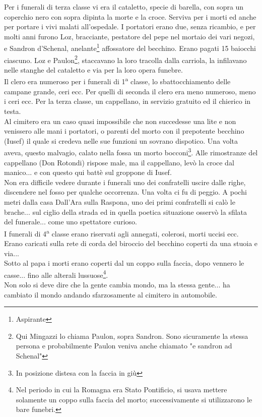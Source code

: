 \indent Per i funerali di terza classe vi era il cataletto, specie di barella, con sopra un coperchio nero con sopra dipinta la morte e la croce. Serviva per i morti ed anche per portare i vivi malati all'ospedale. I portatori erano due, senza ricambio, e per molti anni furono Loz, bracciante, pestatore del pepe nel mortaio dei vari negozi, e Sandron d'Schenal, anelante\footnote{Aspirante} affossatore del becchino. Erano pagati 15 baiocchi ciascuno. Loz e Paulon\footnote{Qui Mingazzi lo chiama Paulon, sopra Sandron. Sono sicuramente la stessa persona e probabilmente Paulon veniva anche chiamato "e sandron ad Schenal"}, staccavano la loro tracolla dalla carriola, la infilavano nelle stanghe del cataletto e via per la loro opera funebre.\\
\indent Il clero era numeroso per i funerali di 1\textsuperscript{a} classe, lo sbattocchiamento delle campane grande, ceri ecc. Per quelli di seconda il clero era meno numeroso, meno i ceri ecc. Per la terza classe, un cappellano, in servizio gratuito ed il chierico in testa.\\
\indent Al cimitero era un caso quasi impossibile che non succedesse una lite e non venissero alle mani i portatori, o parenti del morto con il prepotente becchino (Iusef) il quale si credeva nelle sue funzioni un sovrano dispotico. Una volta aveva, questo malvagio, calato nella fossa un morto bocconi\footnote{In posizione distesa con la faccia in giù}. Alle rimostranze del cappellano (Don Rotondi) rispose male, ma il cappellano, levò la croce dal manico... e con questo qui battè sul groppone di Iusef.\\
\indent Non era difficile vedere durante i funerali uno dei confratelli uscire dalle righe, discendere nel fosso per qualche occorrenza. Una volta ci fu di peggio. A pochi metri dalla casa Dall'Ara sulla  Raspona, uno dei primi confratelli si calò le brache... sul ciglio della strada ed in quella poetica situazione osservò la sfilata del funerale... come uno spettatore curioso.\\
\indent I funerali di 4\textsuperscript{a} classe erano riservati agli annegati, colerosi, morti uccisi ecc. Erano caricati sulla rete di corda del biroccio del becchino coperti da una stuoia e via...\\
\indent Sotto al papa i morti erano coperti dal un coppo sulla faccia, dopo vennero le casse... fino alle alterali lussuose\footnote{Nel periodo in cui la Romagna era Stato Pontificio, si usava mettere solamente un coppo sulla faccia del morto; successivamente si utilizzarono le bare funebri.}.\\
\indent Non solo si deve dire che la gente cambia mondo, ma la stessa gente... ha cambiato il mondo andando sfarzosamente al cimitero in automobile. 




